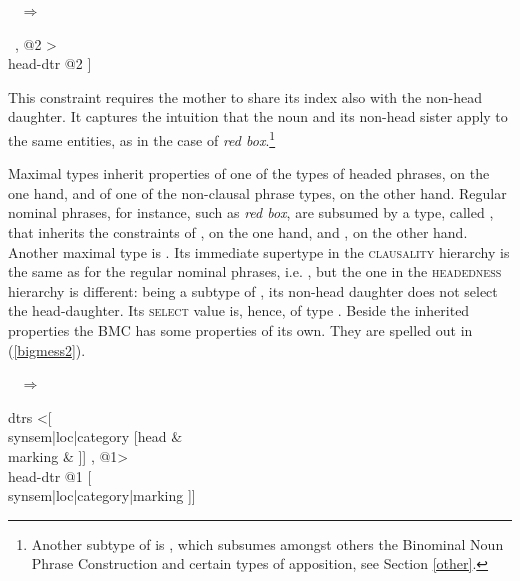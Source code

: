 \documentclass[output=paper
                ,modfonts
                ,nonflat
	        ,collection
	        ,collectionchapter
	        ,collectiontoclongg
 	        ,biblatex
                ,babelshorthands
                ,newtxmath
                ,draftmode
                ,colorlinks, citecolor=brown
]{./langsci/langscibook}
\begin{document}
\begin{exe}
\ex\label{mononom} 
 ~ $\Rightarrow$ ~ 
\begin{avm}
[synsem|loc|content|index @1      \\
 dtrs <[synsem|loc|content|index @1 ] ~, @2 > \\
 head-dtr @2  ]
\end{avm}
\end{exe}

\noindent 
This constraint requires the mother to share its index also with the 
non-head daughter. It captures the intuition that the 
noun and its non-head sister apply to the same entities, as in 
the case of \emph{red box}.\footnote{Another subtype of  
is , which subsumes amongst others 
the Binominal Noun Phrase Construction and certain types of apposition,
see Section \ref{other}.}  

Maximal types inherit properties of one of the types of headed phrases,
on the one hand, and of one of the non-clausal phrase types, on the other hand.  
Regular nominal phrases, for instance, such as \emph{red box}, are subsumed 
by a type, called , that inherits the 
constraints of , on the one hand, and 
, on the other hand.  
Another maximal type is . 
Its immediate supertype in the \textsc{clausality} hierarchy is the same 
as for the regular nominal phrases, i.e. , 
but the one in the \textsc{headedness} hierarchy is different: 
being a subtype of , 
its non-head daughter does not select the head-daughter. Its \textsc{select} 
value is, hence, of type . 
Beside the inherited properties the BMC has some properties of its own.   
They are spelled out in (\ref{bigmess2}).

\begin{exe}
\ex\label{bigmess2} 
 ~ $\Rightarrow$ ~ 
\begin{avm}
 dtrs <[                             \\
          synsem|loc|category [head    &       \\
                               marking & ]] , @1> \\
 head-dtr @1 [                    \\
                synsem|loc|category|marking ]]
\end{avm}
\end{exe}
\end{document}
